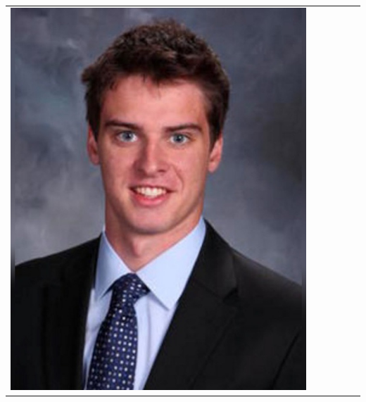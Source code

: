 \documentclass[landscape,a0paper,fontscale=0.292]{baposter}
\begin{document}
\begin{poster}
{\begin{center}
\begin{tabularx}{\linewidth}{X X X X X X}
{\centering \includegraphics[width=0.6\linewidth]{mfe.jpg}}\\ 


\end{tabularx}
\end{center}}
\end{poster}
\end{document}
